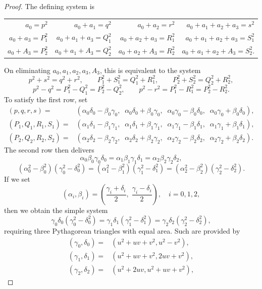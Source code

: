 \documentclass[10pt]{amsart}
\theoremstyle{plain}
\begin{document}
\begin{proof} 
The defining system is
\begin{center}
\begin{tabular}{rrrr}
	$a_0=p^2$ & $a_0+a_1=q^2$ & $a_0+a_2=r^2$ & $a_0+a_1+a_2+a_3=s^2$ \\
	$a_0+a_3=P_1^2$ & $a_0+a_1+a_3=Q_1^2$ & $a_0+a_2+a_3=R_1^2$ & $a_0+a_1+a_2+a_3=S_1^2$ \\
	$a_0+A_3=P_2^2$ & $a_0+a_1+A_3=Q_2^2$ & $a_0+a_2+A_3=R_2^2$ & $a_0+a_1+a_2+A_3=S_2^2$.
\end{tabular}
\end{center}
On eliminating $a_0,a_1,a_2,a_3,A_3$, this is equivalent to the system
\[ p^2+s^2=q^2+r^2, \qquad P_1^2+S_1^2=Q_1^2+R_1^2, \qquad P_2^2+S_2^2=Q_2^2+R_2^2, \]
\[ p^2-q^2 = P_1^2-Q_1^2 = P_2^2-Q_2^2, \qquad p^2-r^2 = P_1^2-R_1^2 = P_2^2-R_2^2. \]
To satisfy the first row, set
\begin{align*}
	(p,q,r,s) = & (\alpha_0 \delta_0-\beta_0 \gamma_0, \;\; \alpha_0 \delta_0+\beta_0 \gamma_0, \;\; \alpha_0 \gamma_0-\beta_0 \delta_0, \;\; \alpha_0 \gamma_0+\beta_0 \delta_0), \\
	(P_1,Q_1,R_1,S_1) = & (\alpha_1 \delta_1-\beta_1 \gamma_1, \;\; \alpha_1
 \delta_1+\beta_1 \gamma_1, \;\; \alpha_1 \gamma_1-\beta_1 \delta_1, \;\; \alpha_1 \gamma_1+\beta_1 \delta_1), \\
	(P_2,Q_2,R_2,S_2) = & (\alpha_2 \delta_2-\beta_2 \gamma_2, \;\; \alpha_2
 \delta_2+\beta_2 \gamma_2, \;\; \alpha_2 \gamma_2-\beta_2 \delta_2, \;\; \alpha_2 \gamma_2+\beta_2 \delta_2).
\end{align*}
The second row then delivers
\[ \alpha_0 \beta_0 \gamma_0 \delta_0 = \alpha_1 \beta_1 \gamma_1 \delta_1 = \alpha_2 \beta_2 \gamma_2 \delta_2, \]
\[ (\alpha_0^2-\beta_0^2)(\gamma_0^2-\delta_0^2) = (\alpha_1^2-\beta_1^2)(\gamma
_1^2-\delta_1^2) = (\alpha_2^2-\beta_2^2)(\gamma_2^2-\delta_2^2). \] 
If we set
\[ (\alpha_i,\beta_i)=\left( \frac{\gamma_i+\delta_i}{2},\;\frac{\gamma_i-\delta_i}{2} \right), \quad i=0,1,2, \]
then we obtain the simple system
\[ \gamma_0 \delta_0(\gamma_0^2-\delta_0^2) = \gamma_1 \delta_1(\gamma_1^2-\delta_1^2) = \gamma_2 \delta_2(\gamma_2^2-\delta_2^2), \]
requiring three Pythagorean triangles with equal area. Such are provided by
\begin{align*}
	(\gamma_0,\delta_0) = & (u^2+u v+v^2, u^2-v^2), \\
	(\gamma_1,\delta_1) = & (u^2+u v+v^2, 2u v+v^2), \\
	(\gamma_2,\delta_2) = & (u^2+2 u v, u^2+u v+v^2),
\end{align*}

\end{proof}
\end{document}
